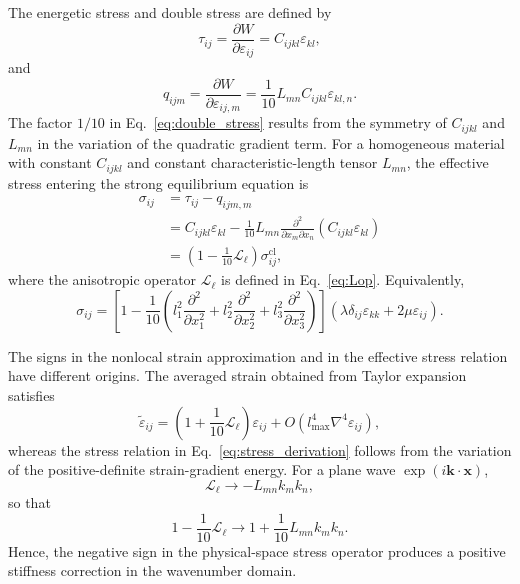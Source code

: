 \documentclass[final,3p,times,fleqn]{elsarticle}
\begin{document}
The energetic stress and double stress are defined by
\begin{equation}\label{eq:energetic_stress}
\tau_{ij}
=
\frac{\partial W}{\partial\varepsilon_{ij}}
=
C_{ijkl}\varepsilon_{kl},
\end{equation}
and
\begin{equation}\label{eq:double_stress}
q_{ijm}
=
\frac{\partial W}{\partial\varepsilon_{ij,m}}
=
\frac{1}{10}
L_{mn}
C_{ijkl}\varepsilon_{kl,n}.
\end{equation}
The factor $1/10$ in Eq.~\eqref{eq:double_stress} results from the
symmetry of $C_{ijkl}$ and $L_{mn}$ in the variation of the quadratic
gradient term. For a homogeneous material with constant $C_{ijkl}$ and
constant characteristic-length tensor $L_{mn}$, the effective stress
entering the strong equilibrium equation is
\begin{align}\label{eq:stress_derivation}
\sigma_{ij}
&=
\tau_{ij}
-
q_{ijm,m} \nonumber\\
&=
C_{ijkl}\varepsilon_{kl}
-
\frac{1}{10}
L_{mn}
\frac{\partial^2}{\partial x_m\partial x_n}
\left(C_{ijkl}\varepsilon_{kl}\right) \nonumber\\
&=
\left(1-\frac{1}{10}\mathcal{L}_{\ell}\right)
\sigma_{ij}^{\mathrm{cl}},
\end{align}
where the anisotropic operator $\mathcal{L}_{\ell}$ is defined in
Eq.~\eqref{eq:Lop}. Equivalently,
\begin{equation}\label{eq:stress_explicit}
\sigma_{ij}
=
\left[
1
-
\frac{1}{10}
\left(
l_1^2\frac{\partial^2}{\partial x_1^2}
+
l_2^2\frac{\partial^2}{\partial x_2^2}
+
l_3^2\frac{\partial^2}{\partial x_3^2}
\right)
\right]
\left(
\lambda\delta_{ij}\varepsilon_{kk}
+
2\mu\varepsilon_{ij}
\right).
\end{equation}

The signs in the nonlocal strain approximation and in the effective
stress relation have different origins. The averaged strain obtained from
Taylor expansion satisfies
\begin{equation}\label{eq:strain_sign_remark}
\tilde{\varepsilon}_{ij}
=
\left(1+\frac{1}{10}\mathcal{L}_{\ell}\right)\varepsilon_{ij}
+
O(l_{\max}^{4}\nabla^{4}\varepsilon_{ij}),
\end{equation}
whereas the stress relation in Eq.~\eqref{eq:stress_derivation} follows
from the variation of the positive-definite strain-gradient energy. For a
plane wave $\exp(i\mathbf{k}\cdot\mathbf{x})$,
\[
\mathcal{L}_{\ell}
\rightarrow
-
L_{mn}k_m k_n,
\]
so that
\[
1-\frac{1}{10}\mathcal{L}_{\ell}
\rightarrow
1+\frac{1}{10}L_{mn}k_m k_n .
\]
Hence, the negative sign in the physical-space stress operator produces
a positive stiffness correction in the wavenumber domain.
\end{document}
